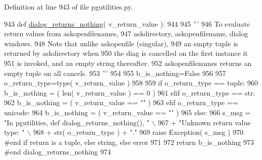 Definition at line 943 of file pgutilities.\+py.


\begin{DoxyCode}
943 \textcolor{keyword}{def }\hyperlink{namespacenegui_1_1pgutilities_aa839d4997d2bd2c15016c33cc7fce3b0}{dialog\_returns\_nothing}( v\_return\_value ):
944 
945     \textcolor{stringliteral}{'''}
946 \textcolor{stringliteral}{    To evaluate return values from askopenfilenames,}
947 \textcolor{stringliteral}{    askdirectory, askopenfilename, dialog windows.}
948 \textcolor{stringliteral}{    Note that unlike askopenfile (singular),}
949 \textcolor{stringliteral}{    an empty tuple is returned by askdirectory when}
950 \textcolor{stringliteral}{    the diag is cancelled on the first instance it}
951 \textcolor{stringliteral}{    is invoked, and an empty string thereafter.  }
952 \textcolor{stringliteral}{    askopenfilenames returns an empty tuple on all cancels.}
953 \textcolor{stringliteral}{    '''} 
954 
955     b\_is\_nothing=\textcolor{keyword}{False}
956 
957     o\_return\_type=type( v\_return\_value )
958 
959     \textcolor{keywordflow}{if} o\_return\_type == tuple:
960         b\_is\_nothing = ( len( v\_return\_value ) == 0 )
961     \textcolor{keywordflow}{elif} o\_return\_type == str:
962         b\_is\_nothing = ( v\_return\_value == \textcolor{stringliteral}{""} )
963     \textcolor{keywordflow}{elif} o\_return\_type == unicode:
964         b\_is\_nothing = ( v\_return\_value == \textcolor{stringliteral}{""} )
965     \textcolor{keywordflow}{else}:
966         s\_msg = \textcolor{stringliteral}{"In pgutilities, def dialog\_returns\_nothing(), "} \(\backslash\)
967                 + \textcolor{stringliteral}{"Unknown return value type: "} \(\backslash\)
968                 + str( o\_return\_type ) + \textcolor{stringliteral}{"."}
969         \textcolor{keywordflow}{raise} Exception( s\_msg )
970     \textcolor{comment}{#end if return is a tuple, else string, else error}
971 
972     \textcolor{keywordflow}{return} b\_is\_nothing 
973 \textcolor{comment}{#end dialog\_returns\_nothing}
974 
\end{DoxyCode}
